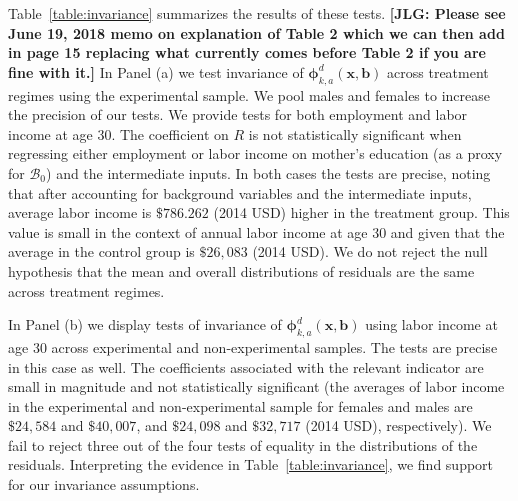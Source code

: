 Table~\ref{table:invariance} summarizes the results of these tests. \textbf{[JLG: Please see June 19, 2018 memo on explanation of Table 2 which we can then add in page 15 replacing what currently comes before Table 2 if you are fine with it.]} In Panel (a) we test invariance of $\bm{\phi}_{k,a}^d \left( \bm{x}, \bm{b} \right)$ across treatment regimes using the experimental sample. We pool males and females to increase the precision of our tests. We provide tests for both employment and labor income at age 30. The coefficient on $R$ is not statistically significant when regressing either employment or labor income on mother's education (as a proxy for $\mathcal{B}_{0}$) and the intermediate inputs. In both cases the tests are precise, noting that after accounting for background variables and the intermediate inputs, average labor income is $\$786.262$ (2014 USD) higher in the treatment group. This value is small in the context of annual labor income at age 30 and given that the average in the control group is $\$26,083$ (2014 USD). We do not reject the null hypothesis that the mean and overall distributions of residuals are the same across treatment regimes.

In Panel (b) we display tests of invariance of $\bm{\phi}_{k,a}^d \left( \bm{x}, \bm{b} \right)$ using labor income at age 30 across experimental and non-experimental samples. The tests are precise in this case as well. The coefficients associated with the relevant indicator are small in magnitude and not statistically significant (the averages of labor income in the experimental and non-experimental sample for females and males are $\$24,584$ and $\$40,007$, and  $\$24,098$ and $\$32,717$ (2014 USD), respectively). We fail to reject three out of the four tests of equality in the distributions of the residuals. Interpreting the evidence in Table~\ref{table:invariance}, we find support for our invariance assumptions.

